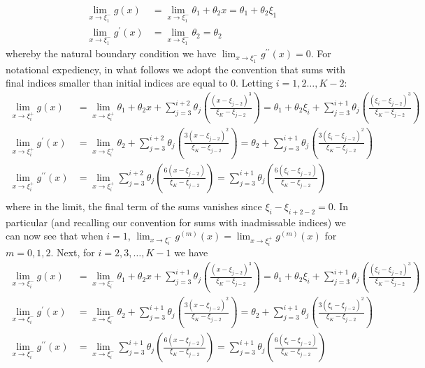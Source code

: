 \documentclass[10pt]{article}
\newcommand{\bp}[1]{\left({#1}\right)}
\newcommand{\1}[1]{\mathbbm{1}_{#1}}
\begin{document}
    \begin{align*}
        \lim_{x\rightarrow\xi_1^-}g(x)&=\lim_{x\rightarrow\xi_1^-}\theta_1+\theta_2x=\theta_1+\theta_2\xi_1\\
        \lim_{x\rightarrow\xi_1^-}g^\prime(x)&=\lim_{x\rightarrow\xi_1^-}\theta_2=\theta_2
    \end{align*}
    whereby the natural boundary condition we have $\lim_{x\rightarrow\xi_1^-}g^{\prime\prime}(x)=0$. For notational expediency, in what follows we adopt the convention that sums with final indices smaller than initial indices are equal to $0$. Letting $i=1,2\dots,K-2$:
    \begin{align*}
        \lim_{x\rightarrow\xi_i^+}g(x)&=\lim_{x\rightarrow\xi_i^+}\theta_1+\theta_2x+\sum_{j=3}^{i+2}\theta_j\bp{\frac{(x-\xi_{j-2})^3}{\xi_K-\xi_{j-2}}}=\theta_1+\theta_2\xi_i+\sum_{j=3}^{i+1}\theta_j\bp{\frac{(\xi_i-\xi_{j-2})^3}{\xi_K-\xi_{j-2}}}\\
        \lim_{x\rightarrow\xi_i^+}g^\prime(x)&=\lim_{x\rightarrow\xi_i^+}\theta_2+\sum_{j=3}^{i+2}\theta_j\bp{\frac{3(x-\xi_{j-2})^2}{\xi_K-\xi_{j-2}}}=\theta_2+\sum_{j=3}^{i+1}\theta_j\bp{\frac{3(\xi_i-\xi_{j-2})^2}{\xi_K-\xi_{j-2}}}\\
        \lim_{x\rightarrow\xi_i^+}g^{\prime\prime}(x)&=\lim_{x\rightarrow\xi_i^+}\sum_{j=3}^{i+2}\theta_j\bp{\frac{6(x-\xi_{j-2})}{\xi_K-\xi_{j-2}}}=\sum_{j=3}^{i+1}\theta_j\bp{\frac{6(\xi_i-\xi_{j-2})}{\xi_K-\xi_{j-2}}}\\
    \end{align*}
    where in the limit, the final term of the sums vanishes since $\xi_{i}-\xi_{i+2-2}=0$. In particular (and recalling our convention for sums with inadmissable indices) we can now see that when $i=1$, $\lim_{x\rightarrow\xi_i^-}g^{(m)}(x)=\lim_{x\rightarrow\xi_i^+}g^{(m)}(x)$ for $m=0,1,2$. Next, for $i=2,3,\dots,K-1$ we have
    \begin{align*}
        \lim_{x\rightarrow\xi_i^-}g(x)&=\lim_{x\rightarrow\xi_i^-}\theta_1+\theta_2x+\sum_{j=3}^{i+1}\theta_j\bp{\frac{(x-\xi_{j-2})^3}{\xi_K-\xi_{j-2}}}=\theta_1+\theta_2\xi_i+\sum_{j=3}^{i+1}\theta_j\bp{\frac{(\xi_i-\xi_{j-2})^3}{\xi_K-\xi_{j-2}}}\\
        \lim_{x\rightarrow\xi_i^-}g^\prime(x)&=\lim_{x\rightarrow\xi_i^-}\theta_2+\sum_{j=3}^{i+1}\theta_j\bp{\frac{3(x-\xi_{j-2})^2}{\xi_K-\xi_{j-2}}}=\theta_2+\sum_{j=3}^{i+1}\theta_j\bp{\frac{3(\xi_i-\xi_{j-2})^2}{\xi_K-\xi_{j-2}}}\\
        \lim_{x\rightarrow\xi_i^-}g^{\prime\prime}(x)&=\lim_{x\rightarrow\xi_i^-}\sum_{j=3}^{i+1}\theta_j\bp{\frac{6(x-\xi_{j-2})}{\xi_K-\xi_{j-2}}}=\sum_{j=3}^{i+1}\theta_j\bp{\frac{6(\xi_i-\xi_{j-2})}{\xi_K-\xi_{j-2}}}\\
    \end{align*}
\end{document}
